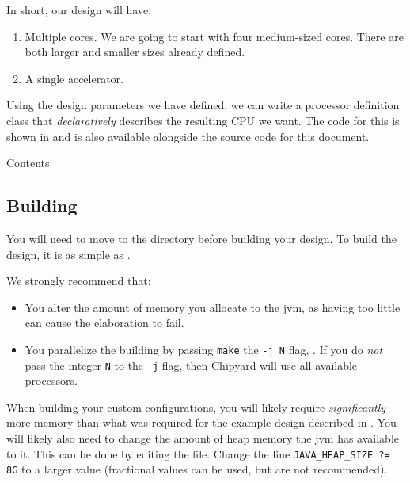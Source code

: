 In short, our design will have:
\begin{enumerate}
\item Multiple  cores.
  We are going to start with four medium-sized cores.
  There are both larger and smaller sizes already defined.
\item A single  accelerator.
\end{enumerate}

Using the design parameters we have defined, we can write a processor definition class that \emph{declaratively} describes the resulting CPU we want.
The code for this is shown in  and is also available alongside the source code for this document.

\begin{listing}[h!tbp]
\caption{ Contents}
\label{lst:Custom_Config-NewTestConfig}
\end{listing}

\subsection{Building}\label{sec:Custom_Config-Building}
You will need to move to the  directory before building your design.
To build the design, it is as simple as .

We strongly recommend that:
\begin{itemize}
\item You alter the amount of memory you allocate to the \Gls{jvm}, as having too little can cause the \gls{elaboration} to fail.
\item You parallelize the building by passing \texttt{make} the \texttt{-j N} flag, .
  If you do \emph{not} pass the integer \texttt{N} to the \texttt{-j} flag, then Chipyard will use all available processors.
\end{itemize}

\begin{blackbox}
  When building your custom configurations, you will likely require \emph{significantly} more memory than what was required for the example design described in .
  You will likely also need to change the amount of heap memory the \gls{jvm} has available to it.
  This can be done by editing the  file.
  Change the line \texttt{JAVA_HEAP_SIZE ?= 8G} to a larger value (fractional values can be used, but are not recommended).
\end{blackbox}

